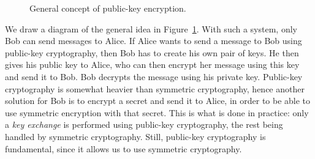 \begin{figure}[h]
  \caption{General concept of public-key encryption.}
  \label{fig:crypto-asym}
\end{figure}
We draw a diagram of the general idea in Figure~\ref{fig:crypto-asym}. With such
a system, only Bob can send messages to Alice. If Alice wants to send a message
to Bob using public-key cryptography, then Bob has to create his own pair of
keys. He then gives his public key to Alice, who can then encrypt her message
using this key and send it to Bob. Bob decrypts the message using his private
key. Public-key cryptography is somewhat heavier than symmetric
cryptography, hence another solution for Bob is to encrypt a secret and send it
to Alice, in order to be able to use symmetric encryption with that secret. This
is what is done in practice: only a \emph{key exchange} is performed using
public-key cryptography, the rest being handled by symmetric cryptography.
Still, public-key cryptography is fundamental, since it allows us to use
symmetric cryptography.

